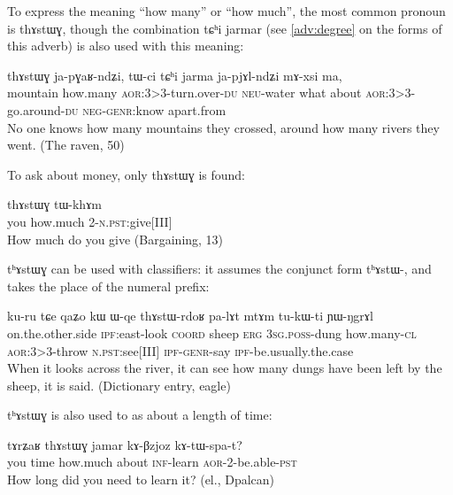 \documentclass[oldfontcommands,oneside,a4paper,11pt]{memoir}
\newcommand{\ipa}[1]{{\phon #1}} %
\newcommand{\aor}{\textsc{aor}}
\newcommand{\coord}{\textsc{coord}}
\newcommand{\du}{\textsc{du}}
\newcommand{\erg}{\textsc{erg}}
\newcommand{\genr}{\textsc{genr}}
\newcommand{\inftv}{\textsc{inf}}
\newcommand{\ipf}{\textsc{ipf}}
\newcommand{\negat}{\textsc{neg}}
\newcommand{\neu}{\textsc{neu}}
\newcommand{\npst}{\textsc{n.pst}}
\newcommand{\poss}{\textsc{poss}}
\newcommand{\pst}{\textsc{pst}}
\newcommand{\sg}{\textsc{sg}}
\begin{document}
To express the meaning ``how many'' or ``how much'', the most common pronoun is \ipa{thɤstɯɣ}, though the combination \ipa{tɕʰi jarmar} (see \ref{adv:degree} on the forms of this adverb) is also used with this meaning:


\begin{exe}
\ex
\gll  \ipa{zgo} 	\ipa{thɤstɯɣ} 	\ipa{ja-pɣaʁ-ndʑi,} 	\ipa{tɯ-ci} 	\ipa{tɕʰi} 	\ipa{jarma} 	\ipa{ja-pjɤl-ndʑi} 	\ipa{mɤ-xsi} 	\ipa{ma,}       \\
 mountain how.many \aor{}:3>3-turn.over-\du{} \neu{}-water what about \aor{}:3>3-go.around-\du{} \negat{}-\genr{}:know apart.from \\
\glt No one knows how many mountains they crossed, around how many rivers they went.  (The raven, 50)
\end{exe}  
  
To ask about money, only 	\ipa{thɤstɯɣ}  is found:

\begin{exe}
\ex
 \gll    \ipa{nɤʑo} 	\ipa{thɤstɯɣ} 	\ipa{tɯ-khɤm}    \\
 you how.much 2-\npst{}:give[III]  \\
\glt  How much do you give (Bargaining, 13)
\end{exe} 

	\ipa{tʰɤstɯɣ} can be used with classifiers: it assumes the conjunct form \ipa{tʰɤstɯ-}, and takes the place of the numeral prefix:
 \begin{exe}
\ex
 \gll   \ipa{phɤri} 	\ipa{ku-ru} 	\ipa{tɕe} 	\ipa{qaʑo} 	\ipa{kɯ} 	\ipa{ɯ-qe} 	\ipa{thɤstɯ-rdoʁ} 	\ipa{pa-lɤt} 	\ipa{mtɤm} 	\ipa{tu-kɯ-ti} 	\ipa{ɲɯ-ŋgrɤl}   \\
  on.the.other.side \ipf{}:east-look \coord{} sheep \erg{} 3\sg{}.\poss{}-dung how.many-\textsc{cl} \aor{}:3>3-throw \npst{}:see[III] \ipf{}-\genr{}-say \ipf{}-be.usually.the.case \\
\glt When it looks across the river, it can see how many dungs have been left by the sheep, it is said.  (Dictionary entry, eagle)
\end{exe} 


	\ipa{tʰɤstɯɣ} is also used to as about a length of time:

\begin{exe}
\ex
 \gll   \ipa{nɤʑo} 	\ipa{tɤrʑaʁ} 	\ipa{thɤstɯɣ} 	\ipa{jamar} 	\ipa{kɤ-βzjoz} 	\ipa{kɤ-tɯ-spa-t?}  \\
 you time how.much about \inftv{}-learn \aor{}-2-be.able-\pst{} \\
\glt   How long did you need to learn it? (el., Dpalcan)
\end{exe} 
 
\end{document}
